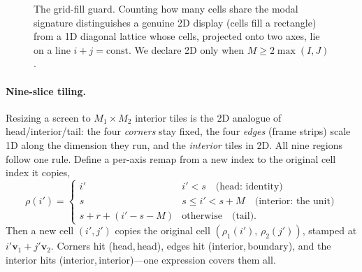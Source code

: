 \documentclass[11pt]{article}
\newcommand{\vv}{\mathbf{v}}
\begin{document}
\begin{figure}[ht]
\centering
{}
\caption{The grid-fill guard. Counting how many cells share the modal signature
distinguishes a genuine 2D display (cells fill a rectangle) from a 1D diagonal
lattice whose cells, projected onto two axes, lie on a line $i+j=\text{const}$.
We declare 2D only when $M\ge 2\max(I,J)$.}
\label{fig:gridfill}
\end{figure}

\paragraph{Nine-slice tiling.} Resizing a screen to $M_1\times M_2$ interior tiles
is the 2D analogue of head/interior/tail: the four \emph{corners} stay fixed, the
four \emph{edges} (frame strips) scale 1D along the dimension they run, and the
\emph{interior} tiles in 2D. All nine regions follow one rule. Define a per-axis
remap from a new index to the original cell index it copies,
\[
\rho(i') = \begin{cases}
i' & i' < s \quad\text{(head: identity)}\\
s & s \le i' < s+M \quad\text{(interior: the unit)}\\
s + r + (i' - s - M) & \text{otherwise} \quad\text{(tail)}.
\end{cases}
\]
Then a new cell $(i',j')$ copies the original cell $(\rho_1(i'),\,\rho_2(j'))$,
stamped at $i'\vv_1 + j'\vv_2$. Corners hit (head,\,head), edges hit
(interior,\,boundary), and the interior hits (interior,\,interior)---one
expression covers them all.
\end{document}
